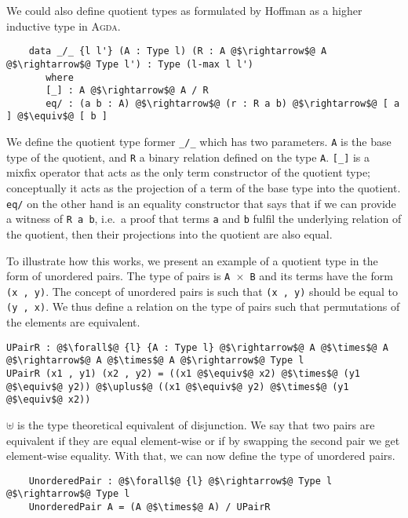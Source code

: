 \documentclass[12pt,twoside,maitrise]{dms}
\theoremstyle{definition}
\numberwithin{equation}{section}
\numberwithin{table}{chapter}
\numberwithin{figure}{chapter}
\newcommand\id[1] {\texttt{#1}}
\newcommand\fn[1] {\texttt{#1}}
\def\Agda{\textsc{Agda}\xspace}
\begin{document}
We could also define quotient types as formulated by
Hoffman\cite{hofmann1995extensional} as a higher inductive type in \Agda{}.

\begin{verbatim}
    data _/_ {l l'} (A : Type l) (R : A @$\rightarrow$@ A @$\rightarrow$@ Type l') : Type (l-max l l')
       where
       [_] : A @$\rightarrow$@ A / R
       eq/ : (a b : A) @$\rightarrow$@ (r : R a b) @$\rightarrow$@ [ a ] @$\equiv$@ [ b ]
\end{verbatim}

We define the quotient type former \fn{\_/\_} which has two parameters. \id{A}
is the base type of the quotient, and \id{R} a binary relation defined on the
type \id{A}. \fn{[\_]} is a mixfix operator that acts as the only term
constructor of the quotient type; conceptually it acts as the projection of a
term of the base type into the quotient. \fn{eq/} on the other hand is an
equality constructor that says that if we can provide a witness of \fn{R a b},
i.e.\ a proof that terms \id{a} and \id{b} fulfil the underlying relation of the
quotient, then their projections into the quotient are also equal.

To illustrate how this works, we present an example of a quotient type in the
form of unordered pairs. The type of pairs is \fn{A $\times$ B} and its terms
have the form \fn{(x , y)}. The concept of unordered pairs is such that \fn{(x ,
  y)} should be equal to \fn{(y , x)}. We thus define a relation on the type of
pairs such that permutations of the elements are equivalent.

\begin{verbatim}
UPairR : @$\forall$@ {l} {A : Type l} @$\rightarrow$@ A @$\times$@ A @$\rightarrow$@ A @$\times$@ A @$\rightarrow$@ Type l
UPairR (x1 , y1) (x2 , y2) = ((x1 @$\equiv$@ x2) @$\times$@ (y1 @$\equiv$@ y2)) @$\uplus$@ ((x1 @$\equiv$@ y2) @$\times$@ (y1 @$\equiv$@ x2))
\end{verbatim}

$\uplus$ is the type theoretical equivalent of disjunction. We say that two
pairs are equivalent if they are equal element-wise or if by swapping the second
pair we get element-wise equality. With that, we can now define the type of
unordered pairs.

\begin{verbatim}
    UnorderedPair : @$\forall$@ {l} @$\rightarrow$@ Type l @$\rightarrow$@ Type l
    UnorderedPair A = (A @$\times$@ A) / UPairR
\end{verbatim}
\end{document}
